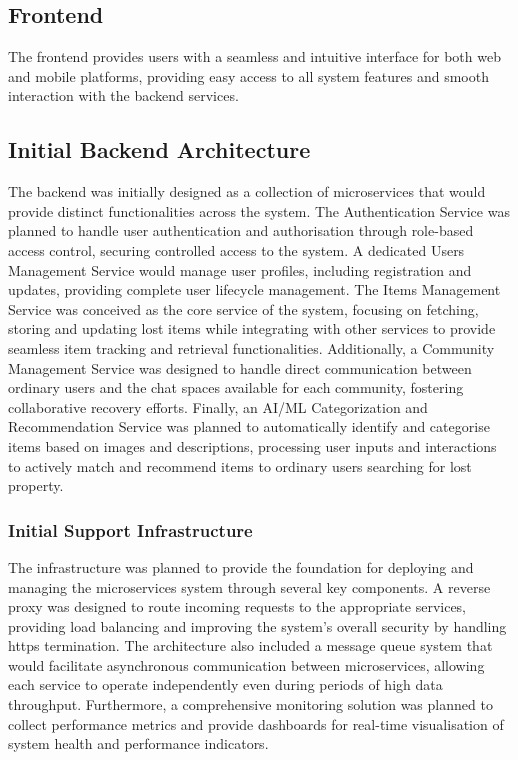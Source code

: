 \subsection{Frontend}

The frontend provides users with a seamless and intuitive interface for both web and mobile platforms, providing easy access to all system features and smooth interaction with the backend services.

\subsection{Initial Backend Architecture}

The backend was initially designed as a collection of microservices that would provide distinct functionalities across the system. The Authentication Service was planned to handle user authentication and authorisation through role-based access control, securing controlled access to the system. A dedicated Users Management Service would manage user profiles, including registration and updates, providing complete user lifecycle management. The Items Management Service was conceived as the core service of the system, focusing on fetching, storing and updating lost items while integrating with other services to provide seamless item tracking and retrieval functionalities. Additionally, a Community Management Service was designed to handle direct communication between ordinary users and the chat spaces available for each community, fostering collaborative recovery efforts. Finally, an AI/ML Categorization and Recommendation Service was planned to automatically identify and categorise items based on images and descriptions, processing user inputs and interactions to actively match and recommend items to ordinary users searching for lost property.

\subsubsection{Initial Support Infrastructure}

The infrastructure was planned to provide the foundation for deploying and managing the microservices system through several key components. A reverse proxy was designed to route incoming requests to the appropriate services, providing load balancing and improving the system's overall security by handling \ac{https} termination. The architecture also included a message queue system that would facilitate asynchronous communication between microservices, allowing each service to operate independently even during periods of high data throughput. Furthermore, a comprehensive monitoring solution was planned to collect performance metrics and provide dashboards for real-time visualisation of system health and performance indicators.

